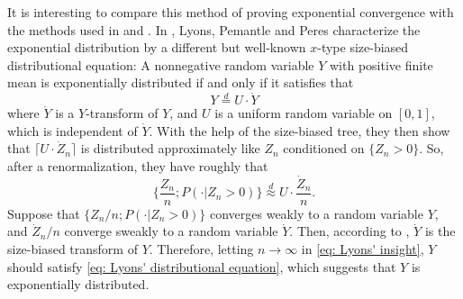 \documentclass[UTF8]{pkuthss}
\theoremstyle{plain}
\theoremstyle{definition}
\numberwithin{equation}{section}
\begin{document}
It is interesting to compare this method of proving exponential convergence with the methods
used in \cite{Geiger2000A-new} and \cite{LyonsPemantlePeres1995Conceptual}.
In \cite{LyonsPemantlePeres1995Conceptual}, Lyons, Pemantle and Peres characterize the exponential distribution by a different
but well-known $x$-type size-biased distributional equation:
A nonnegative random variable $Y$ with positive finite mean is exponentially distributed if and only if it satisfies that
\begin{equation}
\label{eq: Lyons' distributional equation}
Y 		\overset{d}= U \cdot \dot Y
\end{equation}
	where $\dot Y$ is a $Y$-transform of $Y$,  and $U$ is a uniform random variable on $[0,1]$, which is independent of $\dot Y$.
	With the help of the size-biased tree,
	they then show that $\lceil U \cdot \dot Z_n \rceil$ is distributed approximately like $Z_n$ conditioned on $\{Z_n > 0\}$.
	So, after a renormalization, they have roughly that
\begin{equation}
\label{eq: Lyons' insight}
\Big\{\frac{Z_n}{n} ; P(  \cdot| Z_n > 0) \Big\}
\overset{d}{\approx} U \cdot \frac{ \dot Z_n}{n}.
\end{equation}
Suppose that $\{Z_n/n; P(\cdot | Z_n > 0)\}$ converges weakly to a random variable $Y$, and $\dot Z_n /n$ converge sweakly to a random variable $\dot Y$.
Then, according to \cite[Lemma 4.3]{LyonsPemantlePeres1995Conceptual}, $\dot Y$ is the size-biased transform of $Y$.
Therefore, letting $n\to \infty$ in \eqref{eq: Lyons' insight},
$Y$ should satisfy \eqref{eq: Lyons' distributional equation}, which suggests that $Y$ is exponentially distributed.
\end{document}
